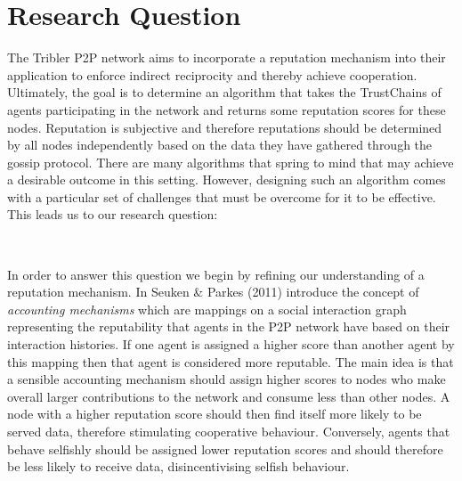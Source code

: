 \newpage
\chapter{Research Question}
\label{chap:Research Question}
\noindent{}The Tribler P2P network aims to incorporate a reputation mechanism into their application to enforce indirect reciprocity and thereby achieve cooperation. Ultimately, the goal is to determine an algorithm that takes the TrustChains of agents participating in the network and returns some reputation scores for these nodes. Reputation is subjective and therefore reputations should be determined by all nodes independently based on the data they have gathered through the gossip protocol. There are many algorithms that spring to mind that may achieve a desirable outcome in this setting. However, designing such an algorithm comes with a particular set of challenges that must be overcome for it to be effective. This leads us to our research question:

\begin{center}
 \vspace{1em}\\
\end{center}
 
\noindent{}In order to answer this question we begin by refining our understanding of a reputation mechanism. In \cite{On the Sybil-Proofness of Accounting Mechanisms} Seuken \& Parkes (2011) introduce the concept of {\it accounting mechanisms} which are mappings on a social interaction graph representing the reputability that agents in the P2P network have based on their interaction histories. If one agent is assigned a higher score than another agent by this mapping then that agent is considered more reputable. The main idea is that a sensible accounting mechanism should assign higher scores to nodes who make overall larger contributions to the network and consume less than other nodes. A node with a higher reputation score should then find itself more likely to be served data, therefore stimulating cooperative behaviour. Conversely, agents that behave selfishly should be assigned lower reputation scores and should therefore be less likely to receive data, disincentivising selfish behaviour. \vspace{1em}\\

